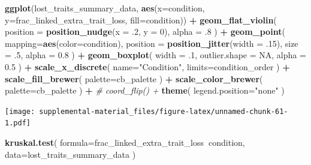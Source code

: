 \documentclass[]{book}
\newenvironment{Shaded}{\begin{snugshade}}{\end{snugshade}}
\newcommand{\CommentTok}[1]{\textcolor[rgb]{0.56,0.35,0.01}{\textit{#1}}}
\newcommand{\DataTypeTok}[1]{\textcolor[rgb]{0.13,0.29,0.53}{#1}}
\newcommand{\DecValTok}[1]{\textcolor[rgb]{0.00,0.00,0.81}{#1}}
\newcommand{\FloatTok}[1]{\textcolor[rgb]{0.00,0.00,0.81}{#1}}
\newcommand{\KeywordTok}[1]{\textcolor[rgb]{0.13,0.29,0.53}{\textbf{#1}}}
\newcommand{\NormalTok}[1]{#1}
\newcommand{\OperatorTok}[1]{\textcolor[rgb]{0.81,0.36,0.00}{\textbf{#1}}}
\newcommand{\OtherTok}[1]{\textcolor[rgb]{0.56,0.35,0.01}{#1}}
\newcommand{\StringTok}[1]{\textcolor[rgb]{0.31,0.60,0.02}{#1}}
\begin{document}
\begin{Shaded}
\begin{Highlighting}[]
\KeywordTok{ggplot}\NormalTok{(lost_traits_summary_data, }\KeywordTok{aes}\NormalTok{(}\DataTypeTok{x=}\NormalTok{condition, }\DataTypeTok{y=}\NormalTok{frac_linked_extra_trait_loss, }\DataTypeTok{fill=}\NormalTok{condition)) }\OperatorTok{+}
\StringTok{  }\KeywordTok{geom_flat_violin}\NormalTok{(}
    \DataTypeTok{position =} \KeywordTok{position_nudge}\NormalTok{(}\DataTypeTok{x =} \FloatTok{.2}\NormalTok{, }\DataTypeTok{y =} \DecValTok{0}\NormalTok{),}
    \DataTypeTok{alpha =} \FloatTok{.8}
\NormalTok{  ) }\OperatorTok{+}
\StringTok{  }\KeywordTok{geom_point}\NormalTok{(}
    \DataTypeTok{mapping=}\KeywordTok{aes}\NormalTok{(}\DataTypeTok{color=}\NormalTok{condition),}
    \DataTypeTok{position =} \KeywordTok{position_jitter}\NormalTok{(}\DataTypeTok{width =} \FloatTok{.15}\NormalTok{),}
    \DataTypeTok{size =} \FloatTok{.5}\NormalTok{,}
    \DataTypeTok{alpha =} \FloatTok{0.8}
\NormalTok{  ) }\OperatorTok{+}
\StringTok{  }\KeywordTok{geom_boxplot}\NormalTok{(}
    \DataTypeTok{width =} \FloatTok{.1}\NormalTok{,}
    \DataTypeTok{outlier.shape =} \OtherTok{NA}\NormalTok{,}
    \DataTypeTok{alpha =} \FloatTok{0.5}
\NormalTok{  ) }\OperatorTok{+}
\StringTok{  }\KeywordTok{scale_x_discrete}\NormalTok{(}
    \DataTypeTok{name=}\StringTok{"Condition"}\NormalTok{,}
    \DataTypeTok{limits=}\NormalTok{condition_order}
\NormalTok{  ) }\OperatorTok{+}
\StringTok{  }\KeywordTok{scale_fill_brewer}\NormalTok{(}
    \DataTypeTok{palette=}\NormalTok{cb_palette}
\NormalTok{  ) }\OperatorTok{+}
\StringTok{  }\KeywordTok{scale_color_brewer}\NormalTok{(}
    \DataTypeTok{palette=}\NormalTok{cb_palette}
\NormalTok{  ) }\OperatorTok{+}
\StringTok{  }\CommentTok{# coord_flip() +}
\StringTok{  }\KeywordTok{theme}\NormalTok{(}
    \DataTypeTok{legend.position=}\StringTok{"none"}
\NormalTok{  )}
\end{Highlighting}
\end{Shaded}

\texttt{[image: supplemental-material\_files/figure-latex/unnamed-chunk-61-1.pdf]}

\begin{Shaded}
\begin{Highlighting}[]
\KeywordTok{kruskal.test}\NormalTok{(}
  \DataTypeTok{formula=}\NormalTok{frac_linked_extra_trait_loss}\OperatorTok{~}\NormalTok{condition,}
  \DataTypeTok{data=}\NormalTok{lost_traits_summary_data}
\NormalTok{)}
\end{Highlighting}
\end{Shaded}
\end{document}

